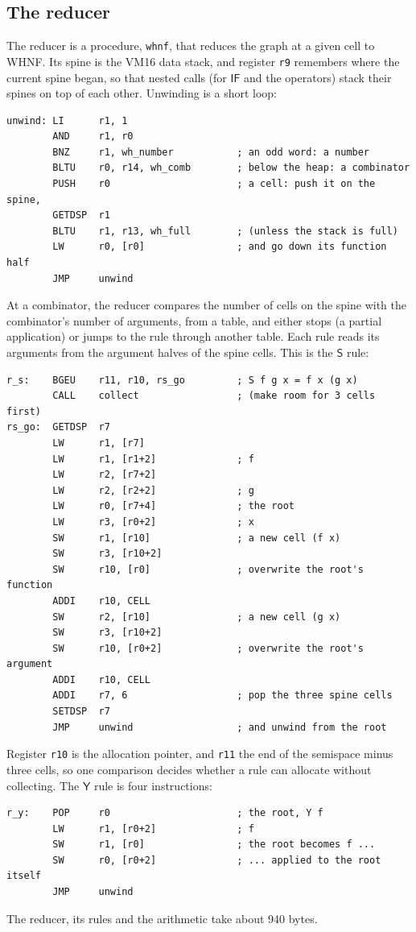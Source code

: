 \documentclass[11pt,a4paper]{article}
\newcommand{\cmb}[1]{\textsf{#1}}
\newcommand{\Sc}{\cmb{S}}
\newcommand{\Y}{\cmb{Y}}
\newcommand{\IF}{\cmb{IF}}
\theoremstyle{definition}
\theoremstyle{plain}
\begin{document}
\subsection{The reducer}

The reducer is a procedure, \texttt{whnf}, that reduces the graph at a given
cell to WHNF. Its spine is the VM16 data stack, and register \texttt{r9}
remembers where the current spine began, so that nested calls (for $\IF$ and
the operators) stack their spines on top of each other. Unwinding is a short
loop:
\begin{lstlisting}
unwind: LI      r1, 1
        AND     r1, r0
        BNZ     r1, wh_number           ; an odd word: a number
        BLTU    r0, r14, wh_comb        ; below the heap: a combinator
        PUSH    r0                      ; a cell: push it on the spine,
        GETDSP  r1
        BLTU    r1, r13, wh_full        ; (unless the stack is full)
        LW      r0, [r0]                ; and go down its function half
        JMP     unwind
\end{lstlisting}
At a combinator, the reducer compares the number of cells on the spine with
the combinator's number of arguments, from a table, and either stops (a
partial application) or jumps to the rule through another table. Each rule
reads its arguments from the argument halves of the spine cells. This is
the $\Sc$ rule:
\begin{lstlisting}
r_s:    BGEU    r11, r10, rs_go         ; S f g x = f x (g x)
        CALL    collect                 ; (make room for 3 cells first)
rs_go:  GETDSP  r7
        LW      r1, [r7]
        LW      r1, [r1+2]              ; f
        LW      r2, [r7+2]
        LW      r2, [r2+2]              ; g
        LW      r0, [r7+4]              ; the root
        LW      r3, [r0+2]              ; x
        SW      r1, [r10]               ; a new cell (f x)
        SW      r3, [r10+2]
        SW      r10, [r0]               ; overwrite the root's function
        ADDI    r10, CELL
        SW      r2, [r10]               ; a new cell (g x)
        SW      r3, [r10+2]
        SW      r10, [r0+2]             ; overwrite the root's argument
        ADDI    r10, CELL
        ADDI    r7, 6                   ; pop the three spine cells
        SETDSP  r7
        JMP     unwind                  ; and unwind from the root
\end{lstlisting}
Register \texttt{r10} is the allocation pointer, and \texttt{r11} the end of
the semispace minus three cells, so one comparison decides whether a rule
can allocate without collecting. The $\Y$ rule is four instructions:
\begin{lstlisting}
r_y:    POP     r0                      ; the root, Y f
        LW      r1, [r0+2]              ; f
        SW      r1, [r0]                ; the root becomes f ...
        SW      r0, [r0+2]              ; ... applied to the root itself
        JMP     unwind
\end{lstlisting}
The reducer, its rules and the arithmetic take about 940 bytes.
\end{document}
